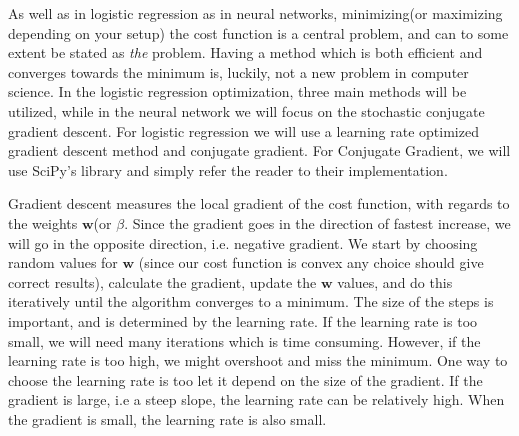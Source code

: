 As well as in logistic regression as in neural networks, minimizing(or maximizing depending on your setup) the cost function is a central problem, and can to some extent be stated as \textit{the} problem. Having a method which is both efficient and converges towards the minimum is, luckily, not a new problem in computer science. In the logistic regression optimization, three main methods will be utilized, while in the neural network we will focus on the stochastic conjugate gradient descent. For logistic regression we will use a learning rate optimized gradient descent method and conjugate gradient. For Conjugate Gradient\cite{Press:2007:NRE:1403886}, we will use SciPy's library\cite{scipy} and simply refer the reader to their implementation.

Gradient descent measures the local gradient of the cost function, with regards to the weights $\bm{w}$(or $\beta$. Since the gradient goes in the direction of fastest increase, we will go in the opposite direction, i.e. negative gradient. We start by choosing random values for $\bm{w}$ (since our cost function is convex any choice should give correct results), calculate the gradient, update the $\bm{w}$ values, and do this iteratively until the algorithm converges to a minimum. The size of the steps is important, and is determined by the learning rate. If the learning rate is too small, we will need many iterations which is time consuming. However, if the learning rate is too high, we might overshoot and miss the minimum. One way to choose the learning rate is too let it depend on the size of the gradient. If the gradient is large, i.e a steep slope, the learning rate can be relatively high. When the gradient is small, the learning rate is also small.

